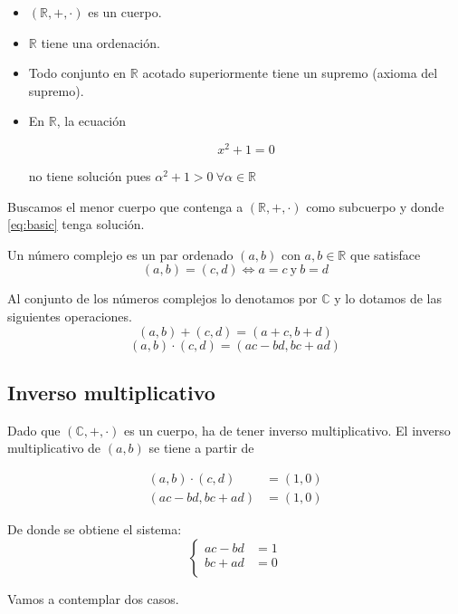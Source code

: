 \documentclass{apuntes}
\begin{document}
\begin{itemize}
\item $(\mathbb{R}, +, \cdot)$ es un cuerpo.
\item $\mathbb{R}$ tiene una ordenación.
\item Todo conjunto en $\mathbb{R}$ acotado superiormente tiene un supremo (axioma del supremo).
\item En $\mathbb{R}$, la ecuación

\begin{equation} \label{eq:basic}
x^2+1=0
\end{equation}

no tiene solución pues $\alpha^2+1>0 \ \forall \alpha \in \mathbb{R}$
\end{itemize}
Buscamos el menor cuerpo que contenga a $(\mathbb{R}, +, \cdot)$ como subcuerpo y donde \eqref{eq:basic} tenga solución.

\begin{defn}
Un número complejo es un par ordenado $(a,b)$ con $a,b\in\mathbb{R}$ que satisface
\[(a,b)=(c,d) \iff a=c\ \text{y} \ b=d\]

Al conjunto de los números complejos lo denotamos por $\mathbb{C}$ y lo dotamos de las siguientes operaciones.
\[(a,b)+(c,d) = (a+c, b+d)\]
\[(a,b)\cdot(c,d) = (ac-bd, bc+ad)\]
\end{defn}

\subsection{Inverso multiplicativo}

Dado que $(\mathbb{C}, +, \cdot)$ es un cuerpo, ha de tener inverso multiplicativo. El inverso multiplicativo de $(a,b)$ se tiene a partir de

\begin{align*}
    (a,b)\cdot(c,d) & = (1,0)\\
    (ac-bd, bc+ad) & = (1,0)
\end{align*}

De donde se obtiene el sistema:
\[
\left\{
\begin{array}{cc}
    ac-bd & = 1\\
    bc+ad & = 0\\
\end{array}
\right.
\]

Vamos a contemplar dos casos.
\end{document}
